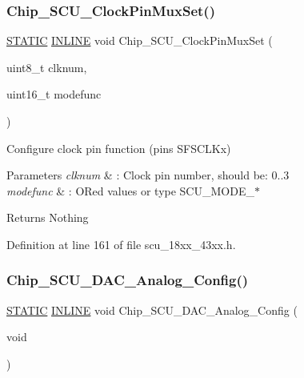 \subsubsection{\texorpdfstring{Chip\+\_\+\+S\+C\+U\+\_\+\+Clock\+Pin\+Mux\+Set()}{Chip\_SCU\_ClockPinMuxSet()}}
{\footnotesize\ttfamily \hyperlink{group___l_p_c___types___public___macros_ga10b2d890d871e1489bb02b7e70d9bdfb}{S\+T\+A\+T\+IC} \hyperlink{spifi__18xx__43xx_8h_a2eb6f9e0395b47b8d5e3eeae4fe0c116}{I\+N\+L\+I\+NE} void Chip\+\_\+\+S\+C\+U\+\_\+\+Clock\+Pin\+Mux\+Set (\begin{DoxyParamCaption}\item[{uint8\+\_\+t}]{clknum,  }\item[{uint16\+\_\+t}]{modefunc }\end{DoxyParamCaption})}



Configure clock pin function (pins S\+F\+S\+C\+L\+Kx) 


\begin{DoxyParams}{Parameters}
{\em clknum} & \+: Clock pin number, should be\+: 0..3 \\
\hline
{\em modefunc} & \+: OR\textquotesingle{}ed values or type S\+C\+U\+\_\+\+M\+O\+D\+E\+\_\+$\ast$ \\
\hline
\end{DoxyParams}
\begin{DoxyReturn}{Returns}
Nothing 
\end{DoxyReturn}


Definition at line 161 of file scu\+\_\+18xx\+\_\+43xx.\+h.

\mbox{\label{group___s_c_u__18_x_x__43_x_x_ga5dd513d87e5d14f80544f59692536a92}} 
\subsubsection{\texorpdfstring{Chip\+\_\+\+S\+C\+U\+\_\+\+D\+A\+C\+\_\+\+Analog\+\_\+\+Config()}{Chip\_SCU\_DAC\_Analog\_Config()}}
{\footnotesize\ttfamily \hyperlink{group___l_p_c___types___public___macros_ga10b2d890d871e1489bb02b7e70d9bdfb}{S\+T\+A\+T\+IC} \hyperlink{spifi__18xx__43xx_8h_a2eb6f9e0395b47b8d5e3eeae4fe0c116}{I\+N\+L\+I\+NE} void Chip\+\_\+\+S\+C\+U\+\_\+\+D\+A\+C\+\_\+\+Analog\+\_\+\+Config (\begin{DoxyParamCaption}\item[{void}]{ }\end{DoxyParamCaption})}




